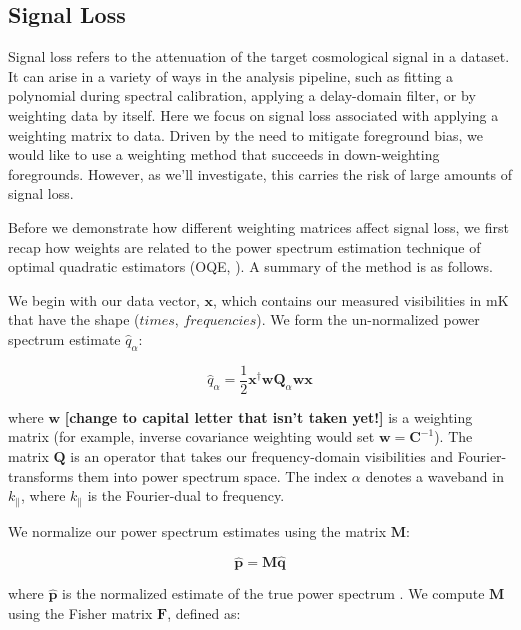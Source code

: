 \documentclass[preprint2,numberedappendix,tighten,twocolappendix]{aastex6}  %
\newcommand{\cc}[1]{{\color{purple} \textbf{[#1]}}}
\begin{document}
\subsection{Signal Loss}
\label{sec:SiglossOverview}

Signal loss refers to the attenuation of the target cosmological signal in a dataset. It can arise in a variety of ways in the analysis pipeline, such as fitting a polynomial during spectral calibration, applying a delay-domain filter, or by weighting data by itself. Here we focus on signal loss associated with applying a weighting matrix to data. Driven by the need to mitigate foreground bias, we would like to use a weighting method that succeeds in down-weighting foregrounds. However, as we'll investigate, this carries the risk of large amounts of signal loss. 

Before we demonstrate how different weighting matrices affect signal loss, we first recap how weights are related to the power spectrum estimation technique of optimal quadratic estimators (OQE, \citealt{liu_et_al2014b}). A summary of the method is as follows. 

We begin with our data vector, $\textbf{x}$, which contains our measured visibilities in mK that have the shape ($times$, $frequencies$). We form the un-normalized power spectrum estimate $\hat{q}_{\alpha}$:

\begin{equation}
\label{eq:qhat}
\hat{q}_{\alpha} = \frac{1}{2}\textbf{x}^{\dagger}\textbf{w}\textbf{Q}_{\alpha}\textbf{w}\textbf{x}
\end{equation}

where $\textbf{w}$ \cc{change to capital letter that isn't taken yet!} is a weighting matrix (for example, inverse covariance weighting would set $\textbf{w} = \textbf{C}^{-1}$). The matrix $\textbf{Q}$ is an operator that takes our frequency-domain visibilities and Fourier-transforms them into power spectrum space. The index $\alpha$ denotes a waveband in $k_{\parallel}$, where $k_{\parallel}$ is the Fourier-dual to frequency.

We normalize our power spectrum estimates using the matrix $\textbf{M}$:

\begin{equation}
\hat{\textbf{p}} = \textbf{M}\hat{\textbf{q}}
\end{equation}

where $\hat{\textbf{p}}$ is the normalized estimate of the true power spectrum . We compute $\textbf{M}$ using the Fisher matrix $\textbf{F}$, defined as:
\end{document}
